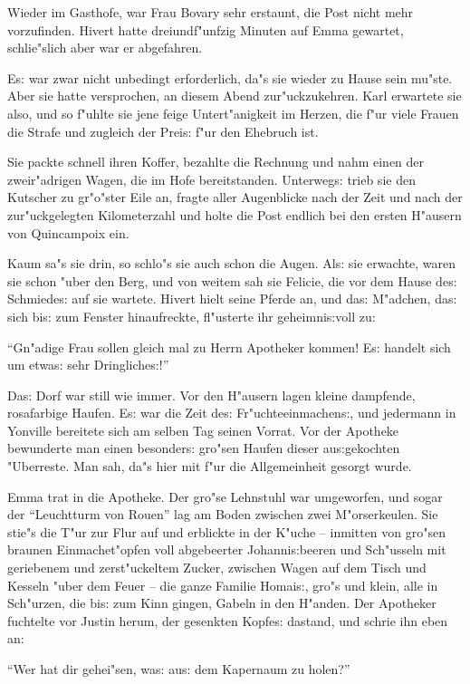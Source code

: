 \documentclass[oneside,12pt]{book}
\newcommand{\s}{s:}%
\begin{document}
Wieder im Gasthofe, war Frau Bovary sehr erstaunt, die Post nicht
mehr vorzufinden. Hivert hatte dreiundf"unfzig Minuten auf Emma
gewartet, schlie"slich aber war er abgefahren.

E{\s} war zwar nicht unbedingt erforderlich, da"s sie wieder zu
Hause sein mu"ste. Aber sie hatte versprochen, an diesem Abend
zur"uckzukehren. Karl erwartete sie also, und so f"uhlte sie jene
feige Untert"anigkeit im Herzen, die f"ur viele Frauen die Strafe
und zugleich der Prei{\s} f"ur den Ehebruch ist.

Sie packte schnell ihren Koffer, bezahlte die Rechnung und nahm
einen der zweir"adrigen Wagen, die im Hofe bereitstanden.
Unterweg{\s} trieb sie den Kutscher zu gr"o"ster Eile an, fragte
aller Augenblicke nach der Zeit und nach der zur"uckgelegten
Kilometerzahl und holte die Post endlich bei den ersten H"ausern
von Quincampoix ein.

Kaum sa"s sie drin, so schlo"s sie auch schon die Augen. Al{\s}
sie erwachte, waren sie schon "uber den Berg, und von weitem sah
sie Felicie, die vor dem Hause de{\s} Schmiede{\s} auf sie
wartete. Hivert hielt seine Pferde an, und da{\s} M"adchen, da{\s}
sich bi{\s} zum Fenster hinaufreckte, fl"usterte ihr
geheimni{\s}voll zu:

"`Gn"adige Frau sollen gleich mal zu Herrn Apotheker kommen! E{\s}
handelt sich um etwa{\s} sehr Dringliche{\s}!"'

Da{\s} Dorf war still wie immer. Vor den H"ausern lagen kleine
dampfende, rosafarbige Haufen. E{\s} war die Zeit de{\s}
Fr"uchteeinmachen{\s}, und jedermann in Yonville bereitete sich am
selben Tag seinen Vorrat. Vor der Apotheke bewunderte man einen
besonder{\s} gro"sen Haufen dieser au{\s}gekochten "Uberreste. Man
sah, da"s hier mit f"ur die Allgemeinheit gesorgt wurde.

Emma trat in die Apotheke. Der gro"se Lehnstuhl war umgeworfen,
und sogar der "`Leuchtturm von Rouen"' lag am Boden zwischen zwei
M"orserkeulen. Sie stie"s die T"ur zur Flur auf und erblickte in
der K"uche -- inmitten von gro"sen braunen Einmachet"opfen voll
abgebeerter Johanni{\s}beeren und Sch"usseln mit geriebenem und
zerst"uckeltem Zucker, zwischen Wagen auf dem Tisch und Kesseln
"uber dem Feuer -- die ganze Familie Homai{\s}, gro"s und klein,
alle in Sch"urzen, die bi{\s} zum Kinn gingen, Gabeln in den
H"anden. Der Apotheker fuchtelte vor Justin herum, der gesenkten
Kopfe{\s} dastand, und schrie ihn eben an:

"`Wer hat dir gehei"sen, wa{\s} au{\s} dem Kapernaum zu holen?"'
\end{document}
